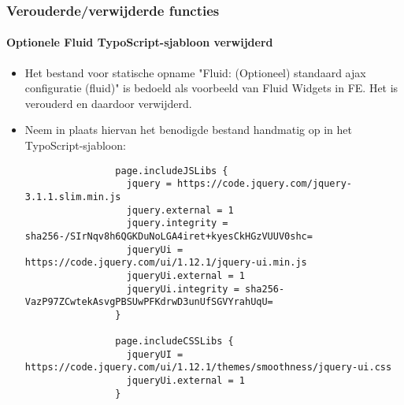 \begin{frame}[fragile]
	\frametitle{Verouderde/verwijderde functies}
	\framesubtitle{Optionele Fluid TypoScript-sjabloon verwijderd}

	\lstset{basicstyle=\tiny\ttfamily}

	\begin{itemize}
		\item Het bestand voor statische opname "Fluid: (Optioneel) standaard ajax configuratie (fluid)" is
			bedoeld als voorbeeld van Fluid Widgets in FE. Het is verouderd en daardoor verwijderd.
		\item Neem in plaats hiervan het benodigde bestand handmatig op in het TypoScript-sjabloon:

			\begin{lstlisting}
				page.includeJSLibs {
				  jquery = https://code.jquery.com/jquery-3.1.1.slim.min.js
				  jquery.external = 1
				  jquery.integrity = sha256-/SIrNqv8h6QGKDuNoLGA4iret+kyesCkHGzVUUV0shc=
				  jqueryUi = https://code.jquery.com/ui/1.12.1/jquery-ui.min.js
				  jqueryUi.external = 1
				  jqueryUi.integrity = sha256-VazP97ZCwtekAsvgPBSUwPFKdrwD3unUfSGVYrahUqU=
				}

				page.includeCSSLibs {
				  jqueryUI = https://code.jquery.com/ui/1.12.1/themes/smoothness/jquery-ui.css
				  jqueryUi.external = 1
				}
			\end{lstlisting}

	\end{itemize}

\end{frame}


